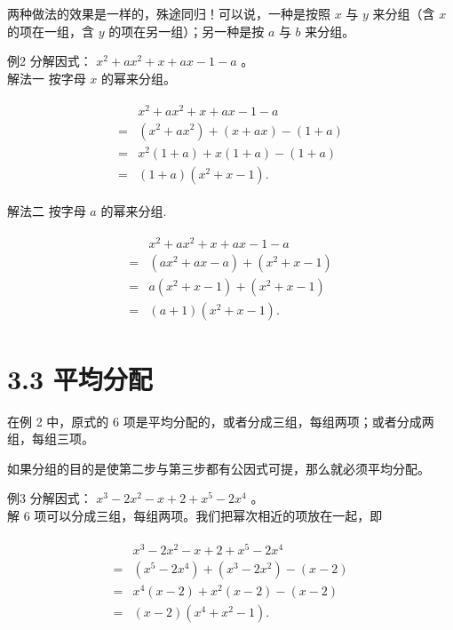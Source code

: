 \documentclass[10pt]{article}
\begin{document}
两种做法的效果是一样的，殊途同归！可以说，一种是按照 $x$ 与 $y$ 来分组（含 $x$ 的项在一组，含 $y$ 的项在另一组）；另一种是按 $a$ 与 $b$ 来分组。

例2 分解因式： $x^{2}+a x^{2}+x+a x-1-a$ 。\\
解法一 按字母 $x$ 的幂来分组。

\begin{align*}
\begin{aligned}
& x^{2}+a x^{2}+x+a x-1-a \\
= & \left(x^{2}+a x^{2}\right)+(x+a x)-(1+a) \\
= & x^{2}(1+a)+x(1+a)-(1+a) \\
= & (1+a)\left(x^{2}+x-1\right) .
\end{aligned}
\end{align*}

解法二 按字母 $a$ 的幂来分组.

\begin{align*}
\begin{aligned}
& x^{2}+a x^{2}+x+a x-1-a \\
= & \left(a x^{2}+a x-a\right)+\left(x^{2}+x-1\right) \\
= & a\left(x^{2}+x-1\right)+\left(x^{2}+x-1\right) \\
= & (a+1)\left(x^{2}+x-1\right) .
\end{aligned}
\end{align*}

\section*{3.3 平均分配}
在例 2 中，原式的 6 项是平均分配的，或者分成三组，每组两项；或者分成两组，每组三项。

如果分组的目的是使第二步与第三步都有公因式可提，那么就必须平均分配。

例3 分解因式： $x^{3}-2 x^{2}-x+2+x^{5}-2 x^{4}$ 。\\
解 6 项可以分成三组，每组两项。我们把幂次相近的项放在一起，即

\begin{align*}
\begin{aligned}
& x^{3}-2 x^{2}-x+2+x^{5}-2 x^{4} \\
= & \left(x^{5}-2 x^{4}\right)+\left(x^{3}-2 x^{2}\right)-(x-2) \\
= & x^{4}(x-2)+x^{2}(x-2)-(x-2) \\
= & (x-2)\left(x^{4}+x^{2}-1\right) .
\end{aligned}
\end{align*}
\end{document}

